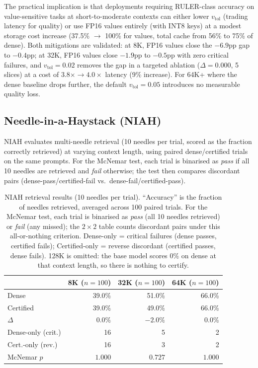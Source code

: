 \documentclass[10pt,twocolumn,a4paper]{article}
\theoremstyle{definition}
\theoremstyle{remark}
\begin{document}
The practical implication is that deployments requiring RULER-class accuracy on value-sensitive tasks at short-to-moderate contexts can either lower $v_{\mathrm{tol}}$ (trading latency for quality) or use FP16 values entirely (with INT8 keys) at a modest storage cost increase (37.5\% $\to$ 100\% for values, total cache from 56\% to 75\% of dense).  Both mitigations are validated: at 8K, FP16 values close the $-6.9$pp gap to $-0.4$pp; at 32K, FP16 values close $-1.9$pp to $-0.5$pp with zero critical failures, and $v_{\mathrm{tol}}{=}0.02$ removes the gap in a targeted ablation ($\Delta{=}0.000$, 5 slices) at a cost of $3.8\times \to 4.0\times$ latency (9\% increase).  For 64K+ where the dense baseline drops further, the default $v_{\mathrm{tol}}{=}0.05$ introduces no measurable quality loss.

\subsection{Needle-in-a-Haystack (NIAH)}
\label{sec:niah}

NIAH evaluates multi-needle retrieval (10 needles per trial, scored as the fraction correctly retrieved) at varying context length, using paired dense/certified trials on the same prompts.  For the McNemar test, each trial is binarised as \emph{pass} if all 10 needles are retrieved and \emph{fail} otherwise; the test then compares discordant pairs (dense-pass/certified-fail vs.\ dense-fail/certified-pass).

\begin{table}[ht]
\centering
\caption{NIAH retrieval results (10 needles per trial).  ``Accuracy'' is the fraction of needles retrieved, averaged across 100 paired trials.  For the McNemar test, each trial is binarised as \emph{pass} (all 10 needles retrieved) or \emph{fail} (any missed); the $2\times 2$ table counts discordant pairs under this all-or-nothing criterion.  Dense-only = critical failures (dense passes, certified fails); Certified-only = reverse discordant (certified passes, dense fails).  128K is omitted: the base model scores 0\% on dense at that context length, so there is nothing to certify.}
\label{tab:niah}
\scriptsize
\begin{tabular}{lrrr}
\toprule
& \textbf{8K} ($n{=}100$) & \textbf{32K} ($n{=}100$) & \textbf{64K} ($n{=}100$) \\
\midrule
Dense     & 39.0\% & 51.0\% & 66.0\% \\
Certified & 39.0\% & 49.0\% & 66.0\% \\
$\Delta$  & $0.0\%$ & $-2.0\%$ & $0.0\%$ \\
Dense-only (crit.)  & 16 & 5 & 2 \\
Cert.-only (rev.) & 16 & 3 & 2 \\
McNemar $p$ & $1.000$ & $0.727$ & $1.000$ \\
\bottomrule
\end{tabular}
\end{table}
\end{document}
